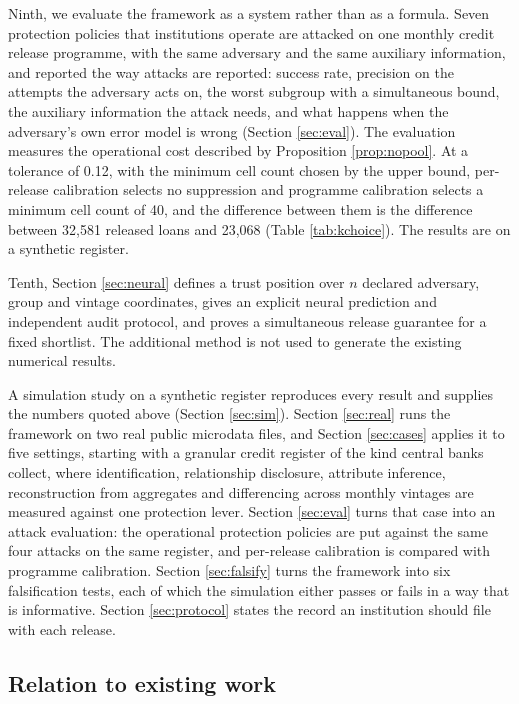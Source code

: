 \documentclass[11pt,a4paper]{article}
\theoremstyle{plain}
\theoremstyle{definition}
\begin{document}
Ninth, we evaluate the framework as a system rather than as a formula. Seven
protection policies that institutions operate are attacked on one monthly credit
release programme, with the same adversary and the same auxiliary information, and
reported the way attacks are reported: success rate, precision on the attempts the
adversary acts on, the worst subgroup with a simultaneous bound, the auxiliary
information the attack needs, and what happens when the adversary's own error model
is wrong (Section \ref{sec:eval}). The evaluation measures the operational cost described by Proposition
\ref{prop:nopool}. At a tolerance of 0.12, with the minimum cell count chosen by
the upper bound, per-release calibration selects no suppression and programme
calibration selects a minimum cell count of 40, and the difference between them
is the difference between 32{,}581 released loans and 23{,}068 (Table
\ref{tab:kchoice}). The results are on a synthetic register.

Tenth, Section \ref{sec:neural} defines a trust position over $n$ declared
adversary, group and vintage coordinates, gives an explicit neural prediction
and independent audit protocol, and proves a simultaneous release guarantee
for a fixed shortlist. The additional method is not used to generate the
existing numerical results.

A simulation study on a synthetic register reproduces every result and supplies
the numbers quoted above (Section \ref{sec:sim}). Section \ref{sec:real} runs the framework on two real
public microdata files, and Section \ref{sec:cases} applies it to five settings,
starting with a granular credit register of the kind central banks collect, where identification, relationship disclosure,
attribute inference, reconstruction from aggregates and differencing across
monthly vintages are measured against one protection lever. Section \ref{sec:eval} turns that
case into an attack evaluation: the operational protection policies are put against
the same four attacks on the same register, and per-release calibration is compared
with programme calibration. Section \ref{sec:falsify}
turns the framework into six falsification tests, each of which the simulation
either passes or fails in a way that is informative. Section \ref{sec:protocol}
states the record an institution should file with each release.

\subsection{Relation to existing work}\label{sec:lit}
\end{document}
